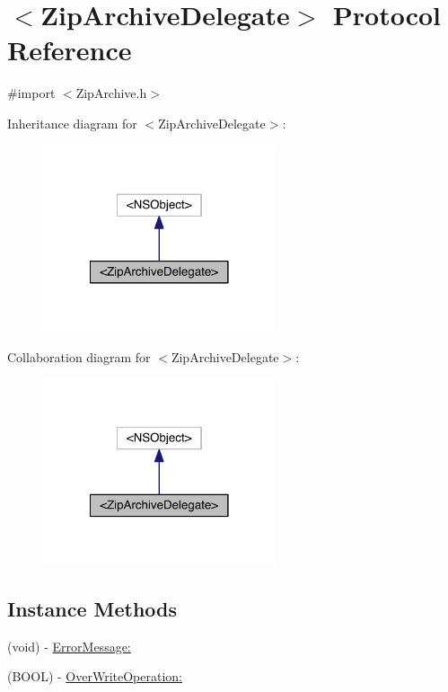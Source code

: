\hypertarget{protocol_zip_archive_delegate-p}{\section{$<$Zip\+Archive\+Delegate$>$ Protocol Reference}
\label{protocol_zip_archive_delegate-p}
}


{\ttfamily \#import $<$Zip\+Archive.\+h$>$}



Inheritance diagram for $<$Zip\+Archive\+Delegate$>$\+:\nopagebreak
\begin{figure}[H]
\begin{center}
\leavevmode
\includegraphics[width=194pt]{d4/d4d/protocol_zip_archive_delegate-p__inherit__graph}
\end{center}
\end{figure}


Collaboration diagram for $<$Zip\+Archive\+Delegate$>$\+:\nopagebreak
\begin{figure}[H]
\begin{center}
\leavevmode
\includegraphics[width=194pt]{d8/d9e/protocol_zip_archive_delegate-p__coll__graph}
\end{center}
\end{figure}
\subsection*{Instance Methods}
\begin{DoxyCompactItemize}
\item 
(void) -\/ \hyperlink{protocol_zip_archive_delegate-p_aa3d161ac9ca24493b6c4bf0d2dbf9459}{Error\+Message\+:}
\item 
(B\+O\+O\+L) -\/ \hyperlink{protocol_zip_archive_delegate-p_a2e45500c825406a69694c2d3b86fa876}{Over\+Write\+Operation\+:}
\end{DoxyCompactItemize}


